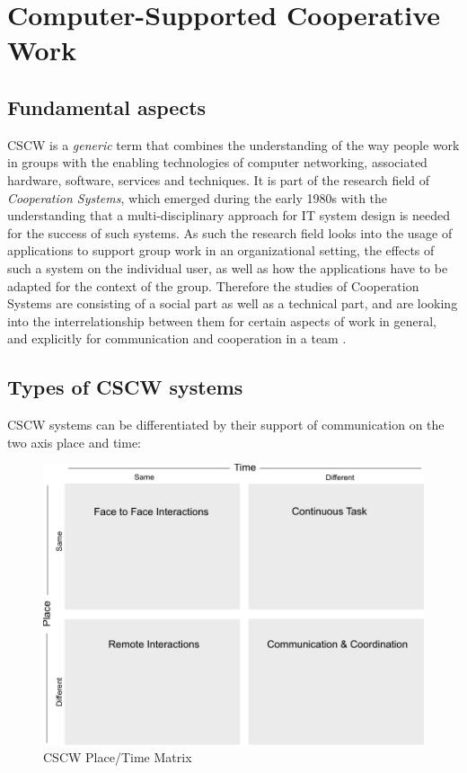 
\section{Computer-Supported Cooperative Work}
\label{sec:cscw}

\subsection{Fundamental aspects}
\label{sec:cscw_definition}

\gls{CSCW} is a \emph{generic} term that combines the understanding of the way people work in groups with the enabling technologies of computer networking, associated hardware, software, services and techniques. It is part of the research field of \emph{Cooperation Systems}, which emerged during the early 1980s with the understanding that a multi-disciplinary approach for \gls{IT} system design is needed for the success of such systems. As such the research field looks into the usage of applications to support group work in an organizational setting, the effects of such a system on the individual user, as well as how the applications have to be adapted for the context of the group. Therefore the studies of Cooperation Systems are consisting of a social part as well as a technical part, and are looking into the interrelationship between them for certain aspects of work in general, and explicitly for communication and cooperation in a team \citep{Grudin1994}.


\subsection{Types of \gls{CSCW} systems}
\label{sec:cscw_types}

CSCW systems can be differentiated by their support of communication on the two axis place and time: \\

\begin{figure}[H]
 \centering
 \includegraphics[width=0.8\columnwidth]{images/cscw_time_place_matrix.pdf}
 \caption[CSCW Place/Time Matrix]{\gls{CSCW} Place/Time Matrix \citep{xx}}
\label{fig:images_cscw_time_place_matrix}
\end{figure}

